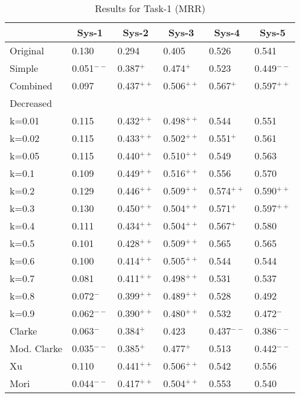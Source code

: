 \begin{table}[p]
  \begin{center}
    \caption{Results for Task-1 (MRR)}
    \begin{tabular}{|l|l|l|l|l|l|} \hline
         &  \multicolumn{1}{c|}{Sys-1}        & \multicolumn{1}{c|}{Sys-2}        & \multicolumn{1}{c|}{Sys-3}        & \multicolumn{1}{c|}{Sys-4}        & \multicolumn{1}{c|}{Sys-5}        \\\hline
Original &  0.130        & 0.294        & 0.405        & 0.526        & 0.541       \\\hline
Simple   &  0.051$^{--}$ & 0.387$^{+}$  & 0.474$^{+}$ & 0.523        & 0.449$^{--}$\\\hline
Combined &  0.097        & 0.437$^{++}$ & 0.506$^{++}$ & 0.567$^{+}$  & 0.597$^{++}$\\\hline
Decreased&               &              &              &              &             \\
k=0.01   &  0.115        & 0.432$^{++}$ & 0.498$^{++}$ & 0.544        & 0.551       \\
k=0.02   &  0.115        & 0.433$^{++}$ & 0.502$^{++}$ & 0.551$^{+}$  & 0.561       \\
k=0.05   &  0.115        & 0.440$^{++}$ & 0.510$^{++}$ & 0.549        & 0.563       \\
k=0.1    &  0.109        & 0.449$^{++}$ & 0.516$^{++}$ & 0.556        & 0.570       \\
k=0.2    &  0.129        & 0.446$^{++}$ & 0.509$^{++}$ & 0.574$^{++}$ & 0.590$^{++}$ \\
k=0.3    &  0.130        & 0.450$^{++}$ & 0.504$^{++}$ & 0.571$^{+}$  & 0.597$^{++}$\\
k=0.4    &  0.111        & 0.434$^{++}$ & 0.504$^{++}$ & 0.567$^{+}$  & 0.580       \\
k=0.5    &  0.101        & 0.428$^{++}$ & 0.509$^{++}$ & 0.565        & 0.565       \\
k=0.6    &  0.100        & 0.414$^{++}$ & 0.505$^{++}$ & 0.544        & 0.544       \\
k=0.7    &  0.081        & 0.411$^{++}$ & 0.498$^{++}$ & 0.531        & 0.537       \\
k=0.8    &  0.072$^{-}$  & 0.399$^{++}$ & 0.489$^{++}$ & 0.528        & 0.492       \\
k=0.9    &  0.062$^{--}$ & 0.390$^{++}$ & 0.480$^{++}$ & 0.532        & 0.472$^{-}$ \\\hline
Clarke   &  0.063$^{-}$  & 0.384$^{+}$  & 0.423        & 0.437$^{--}$ & 0.386$^{--}$\\\hline
Mod. Clarke&0.035$^{--}$ & 0.385$^{+}$  & 0.477$^{+}$  & 0.513        & 0.442$^{--}$\\\hline
Xu       &  0.110        & 0.441$^{++}$ & 0.506$^{++}$ & 0.542        & 0.556\\\hline
Mori     &  0.044$^{--}$ & 0.417$^{++}$ & 0.504$^{++}$ & 0.553        & 0.540\\\hline
\end{tabular}
\label{tab:task-1}
\end{center}
\end{table}

